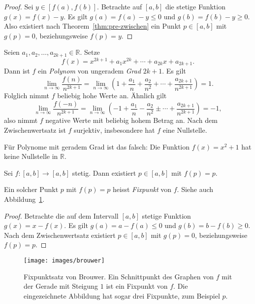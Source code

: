 \documentclass[../main.tex]{subfiles}
\begin{document}
\begin{proof}
  Sei $y \in [f(a), f(b)]$. Betrachte
  auf $[a, b]$ die stetige Funktion
  $g(x) = f(x) - y$.
  Es gilt $g(a) = f(a) - y \leq 0$ und
  $g(b) = f(b) - y \geq 0$.
  Also existiert nach Theorem~\ref{thm:pre-zwischen}
  ein Punkt $p \in [a, b]$ mit $g(p) = 0$,
  beziehungsweise $f(p) = y$.
\end{proof}

\begin{example}
  Seien $a_1, a_2, \dots, a_{2k + 1} \in \mathbb{R}$.
  Setze
  \[
  f(x) = x^{2k+1} + a_1 x^{2k}
  + \cdots + a_{2k}x + a_{2k+1}.
  \]
  Dann ist $f$ ein \emph{Polynom} von ungeradem
  \emph{Grad} $2k + 1$. Es gilt
  \[
    \lim_{n \to \infty} \frac{f(n)}{n^{2k+1}}
    = \lim_{n \to \infty}
    \left( 1 + \frac{a_1}{n} + \frac{a_2}{n^2}
    + \cdots + \frac{a_{2k+1}}{n^{2k+1}}\right) = 1.
  \]
  Folglich nimmt $f$ beliebig hohe Werte an.
  Ähnlich gilt
  \[
    \lim_{n \to \infty} \frac{f(-n)}{n^{2k+1}}
    = \lim_{n \to \infty}
    \left( -1 + \frac{a_1}{n} - \frac{a_2}{n^2}
    \pm \cdots + \frac{a_{2k+1}}{n^{2k+1}}\right) = -1,
  \]
  also nimmt $f$ negative Werte
  mit beliebig hohem Betrag an.
  Nach dem Zwischenwertsatz 
  ist $f$ surjektiv, insbesondere hat $f$ eine Nullstelle.
\end{example}

\begin{remark}
  Für Polynome mit geradem Grad ist das falsch:
  Die Funktion $f(x) = x^2 + 1$ hat keine Nullstelle
  in $\mathbb{R}$.
\end{remark}

\begin{brouwer}
  Sei $f \colon [a, b] \to [a, b]$ stetig.
  Dann existiert $p \in [a, b]$ mit $f(p) = p$.
\end{brouwer}

Ein solcher Punkt $p$ mit $f(p) = p$ heisst \emph{Fixpunkt}
von $f$. Siehe auch Abbildung~\ref{fig:brouwer}.

\begin{proof}
  Betrachte die auf dem Intervall
  $[a, b]$ stetige Funktion
  $g(x) = x - f(x)$.
  Es gilt
  $
    g(a) = a - f(a) \leq 0$
    und
    $g(b) = b - f(b) \geq 0$.
  Nach dem Zwischenwertsatz existiert
  $p \in [a,b]$ mit $g(p) = 0$,
  beziehungsweise $f(p) = p$.
\end{proof}

\begin{figure}[htb]
  \centering
  \texttt{[image: images/brouwer]}
  \caption{Fixpunktsatz von Brouwer.
  Ein Schnittpunkt des Graphen von $f$ mit
der Gerade mit Steigung $1$ ist ein
Fixpunkt von $f$. Die eingezeichnete Abbildung
hat sogar drei Fixpunkte, zum Beispiel $p$.}%
  \label{fig:brouwer}
\end{figure}
\end{document}
